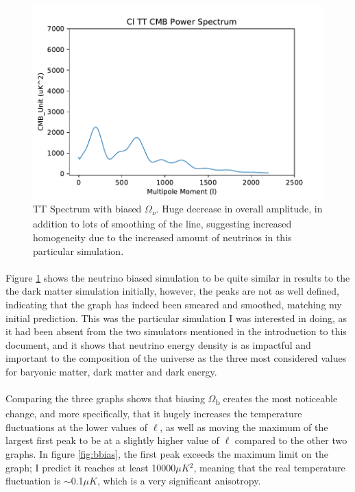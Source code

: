 \documentclass[twoside, fontsize=12pt,
     bibliography=totoc, %
     listof=totoc, %
     index=totoc, %
     onehalfspacing %
]{_MScDiss2017_cls}
\begin{document}
\begin{figure}
	\begin{center}
	\includegraphics{5Cl-TT-vs-l}
	\caption{TT Spectrum with biased $\Omega$\textsubscript{$\nu$}. Huge decrease in overall amplitude, in addition to lots of smoothing of the line, suggesting increased homogeneity due to the increased amount of neutrinos in this particular simulation.}
	\label{fig:vbias}
	\end{center}
\end{figure}

\paragraph{}

Figure \ref{fig:vbias} shows the neutrino biased simulation to be quite similar in results to the the dark matter simulation initially, however, the peaks are not as well defined, indicating that the graph has indeed been smeared and smoothed, matching my initial prediction. This was the particular simulation I was interested in doing, as it had been absent from the two simulators mentioned in the introduction to this document, and it shows that neutrino energy density is as impactful and important to the composition of the universe as the three most considered values for baryonic matter, dark matter and dark energy.

\paragraph{}

Comparing the three graphs shows that biasing $\Omega$\textsubscript{b} creates the most noticeable change, and more specifically, that it hugely increases the temperature fluctuations at the lower values of $\ell$, as well as moving the maximum of the largest first peak to be at a slightly higher value of $\ell$ compared to the other two graphs. In figure \ref{fig:bbias}, the first peak exceeds the maximum limit on the graph; I predict it reaches at least 10000$\mu$$K$$^2$, meaning that the real temperature fluctuation is $\sim$0.1$\mu$$K$, which is a very significant anisotropy. 
\end{document}
